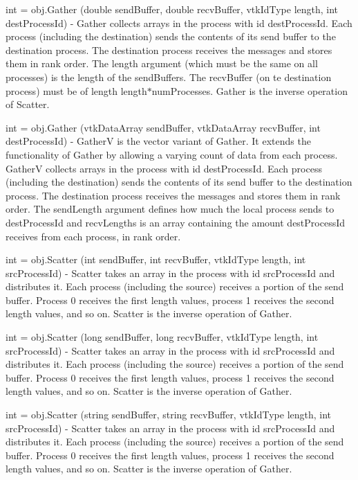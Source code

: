 \begin{DoxyItemize}
\item {\ttfamily int = obj.\-Gather (double send\-Buffer, double recv\-Buffer, vtk\-Id\-Type length, int dest\-Process\-Id)} -\/ Gather collects arrays in the process with id {\ttfamily dest\-Process\-Id}. Each process (including the destination) sends the contents of its send buffer to the destination process. The destination process receives the messages and stores them in rank order. The {\ttfamily length} argument (which must be the same on all processes) is the length of the send\-Buffers. The {\ttfamily recv\-Buffer} (on te destination process) must be of length length$\ast$num\-Processes. Gather is the inverse operation of Scatter.  
\item {\ttfamily int = obj.\-Gather (vtk\-Data\-Array send\-Buffer, vtk\-Data\-Array recv\-Buffer, int dest\-Process\-Id)} -\/ Gather\-V is the vector variant of Gather. It extends the functionality of Gather by allowing a varying count of data from each process. Gather\-V collects arrays in the process with id {\ttfamily dest\-Process\-Id}. Each process (including the destination) sends the contents of its send buffer to the destination process. The destination process receives the messages and stores them in rank order. The {\ttfamily send\-Length} argument defines how much the local process sends to {\ttfamily dest\-Process\-Id} and {\ttfamily recv\-Lengths} is an array containing the amount {\ttfamily dest\-Process\-Id} receives from each process, in rank order.  
\item {\ttfamily int = obj.\-Scatter (int send\-Buffer, int recv\-Buffer, vtk\-Id\-Type length, int src\-Process\-Id)} -\/ Scatter takes an array in the process with id {\ttfamily src\-Process\-Id} and distributes it. Each process (including the source) receives a portion of the send buffer. Process 0 receives the first {\ttfamily length} values, process 1 receives the second {\ttfamily length} values, and so on. Scatter is the inverse operation of Gather.  
\item {\ttfamily int = obj.\-Scatter (long send\-Buffer, long recv\-Buffer, vtk\-Id\-Type length, int src\-Process\-Id)} -\/ Scatter takes an array in the process with id {\ttfamily src\-Process\-Id} and distributes it. Each process (including the source) receives a portion of the send buffer. Process 0 receives the first {\ttfamily length} values, process 1 receives the second {\ttfamily length} values, and so on. Scatter is the inverse operation of Gather.  
\item {\ttfamily int = obj.\-Scatter (string send\-Buffer, string recv\-Buffer, vtk\-Id\-Type length, int src\-Process\-Id)} -\/ Scatter takes an array in the process with id {\ttfamily src\-Process\-Id} and distributes it. Each process (including the source) receives a portion of the send buffer. Process 0 receives the first {\ttfamily length} values, process 1 receives the second {\ttfamily length} values, and so on. Scatter is the inverse operation of Gather.  

\end{DoxyItemize}
